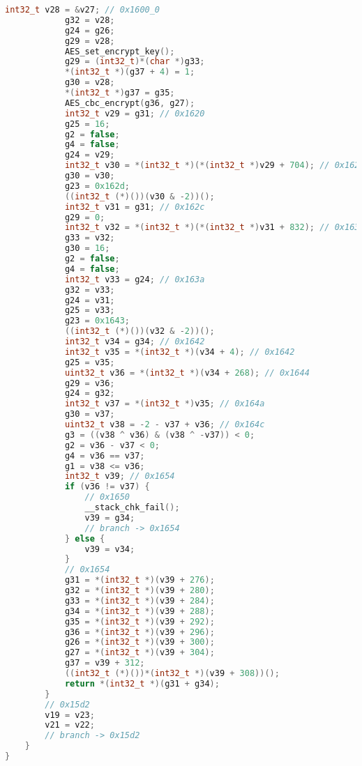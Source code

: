 \begin{appendices}
\begin{lstlisting}[language=C++, caption=Decompiled AES Encrypt(), label=dec_aes_encrypt]
            int32_t v28 = &v27; // 0x1600_0
            g32 = v28;
            g24 = g26;
            g29 = v28;
            AES_set_encrypt_key();
            g29 = (int32_t)*(char *)g33;
            *(int32_t *)(g37 + 4) = 1;
            g30 = v28;
            *(int32_t *)g37 = g35;
            AES_cbc_encrypt(g36, g27);
            int32_t v29 = g31; // 0x1620
            g25 = 16;
            g2 = false;
            g4 = false;
            g24 = v29;
            int32_t v30 = *(int32_t *)(*(int32_t *)v29 + 704); // 0x1626
            g30 = v30;
            g23 = 0x162d;
            ((int32_t (*)())(v30 & -2))();
            int32_t v31 = g31; // 0x162c
            g29 = 0;
            int32_t v32 = *(int32_t *)(*(int32_t *)v31 + 832); // 0x1634
            g33 = v32;
            g30 = 16;
            g2 = false;
            g4 = false;
            int32_t v33 = g24; // 0x163a
            g32 = v33;
            g24 = v31;
            g25 = v33;
            g23 = 0x1643;
            ((int32_t (*)())(v32 & -2))();
            int32_t v34 = g34; // 0x1642
            int32_t v35 = *(int32_t *)(v34 + 4); // 0x1642
            g25 = v35;
            uint32_t v36 = *(int32_t *)(v34 + 268); // 0x1644
            g29 = v36;
            g24 = g32;
            int32_t v37 = *(int32_t *)v35; // 0x164a
            g30 = v37;
            uint32_t v38 = -2 - v37 + v36; // 0x164c
            g3 = ((v38 ^ v36) & (v38 ^ -v37)) < 0;
            g2 = v36 - v37 < 0;
            g4 = v36 == v37;
            g1 = v38 <= v36;
            int32_t v39; // 0x1654
            if (v36 != v37) {
                // 0x1650
                __stack_chk_fail();
                v39 = g34;
                // branch -> 0x1654
            } else {
                v39 = v34;
            }
            // 0x1654
            g31 = *(int32_t *)(v39 + 276);
            g32 = *(int32_t *)(v39 + 280);
            g33 = *(int32_t *)(v39 + 284);
            g34 = *(int32_t *)(v39 + 288);
            g35 = *(int32_t *)(v39 + 292);
            g36 = *(int32_t *)(v39 + 296);
            g26 = *(int32_t *)(v39 + 300);
            g27 = *(int32_t *)(v39 + 304);
            g37 = v39 + 312;
            ((int32_t (*)())*(int32_t *)(v39 + 308))();
            return *(int32_t *)(g31 + g34);
        }
        // 0x15d2
        v19 = v23;
        v21 = v22;
        // branch -> 0x15d2
    }
}
\end{lstlisting}



\end{appendices}

